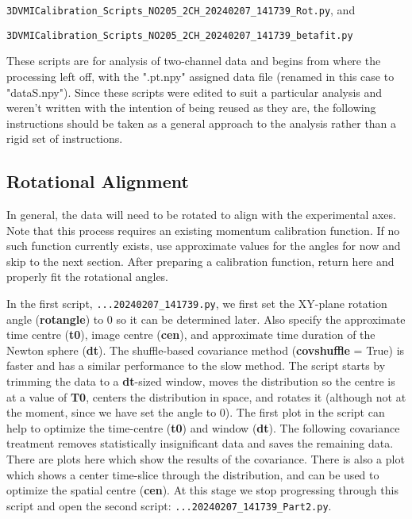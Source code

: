 \documentclass[12pt]{article}
\begin{document}
\noindent
\texttt{3DVMICalibration\_Scripts\_NO205\_2CH\_20240207\_141739\_Rot.py}, and 

\noindent
\texttt{3DVMICalibration\_Scripts\_NO205\_2CH\_20240207\_141739\_betafit.py}

These scripts are for analysis of two-channel data and begins from where the processing left off, with the ".pt.npy" assigned data file (renamed in this case to "dataS.npy").
Since these scripts were edited to suit a particular analysis and weren't written with the intention of being reused as they are, the following instructions should be taken as a general approach to the analysis rather than a rigid set of instructions.

\subsection{Rotational Alignment}

In general, the data will need to be rotated to align with the experimental axes.
Note that this process requires an existing momentum calibration function.
If no such function currently exists, use approximate values for the angles for now and skip to the next section.
After preparing a calibration function, return here and properly fit the rotational angles.

In the first script, \texttt{...20240207\_141739.py}, we first set the XY-plane rotation angle (\textbf{rotangle}) to 0 so it can be determined later.
Also specify the approximate time centre (\textbf{t0}), image centre (\textbf{cen}), and approximate time duration of the Newton sphere (\textbf{dt}).
The shuffle-based covariance method (\textbf{covshuffle} = True) is faster and has a similar performance to the slow method.
The script starts by trimming the data to a \textbf{dt}-sized window, moves the distribution so the centre is at a value of \textbf{T0}, centers the distribution in space, and rotates it (although not at the moment, since we have set the angle to 0).
The first plot in the script can help to optimize the time-centre (\textbf{t0}) and window (\textbf{dt}).
The following covariance treatment removes statistically insignificant data and saves the remaining data.
There are plots here which show the results of the covariance.
There is also a plot which shows a center time-slice through the distribution, and can be used to optimize the spatial centre (\textbf{cen}).
At this stage we stop progressing through this script and open the second script: \texttt{...20240207\_141739\_Part2.py}.
\end{document}
